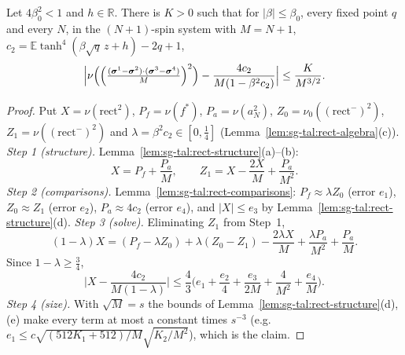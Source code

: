 \begin{theorem}[Proposition~1.8.5, Eq.~(1.238)]
\label{thm:sg-tal:prop-185}
  \leanok
{}
Let $4\beta_0^2<1$ and $h\in\mathbb R$.  There is $K>0$ such that for $|\beta|\le\beta_0$, every fixed point $q$ and every $N$, in the $(N+1)$-spin system with $M=N+1$, $c_2=\mathbb E\tanh^4(\beta\sqrt q\,z+h)-2q+1$,
\[
\Bigl|\nu\Bigl(\Bigl(\tfrac{(\boldsymbol\sigma^1-\boldsymbol\sigma^2)\cdot(\boldsymbol\sigma^3-\boldsymbol\sigma^4)}{M}\Bigr)^2\Bigr)-\frac{4c_2}{M(1-\beta^2c_2)}\Bigr|\le\frac K{M^{3/2}}.
\]
\end{theorem}
\begin{proof}
  \leanok
Put $X=\nu(\mathrm{rect}^2)$, $P_f=\nu(f^*)$, $P_a=\nu(a_N^2)$, $Z_0=\nu_0((\mathrm{rect}^-)^2)$, $Z_1=\nu((\mathrm{rect}^-)^2)$ and $\lambda=\beta^2c_2\in[0,\frac14]$ (Lemma~\ref{lem:sg-tal:rect-algebra}(c)).
\emph{Step 1 (structure).} Lemma~\ref{lem:sg-tal:rect-structure}(a)--(b):
\[
X=P_f+\frac{P_a}M,\qquad Z_1=X-\frac{2X}M+\frac{P_a}{M^2}.
\]
\emph{Step 2 (comparisons).} Lemma~\ref{lem:sg-tal:rect-comparisons}: $P_f\approx\lambda Z_0$ (error $e_1$), $Z_0\approx Z_1$ (error $e_2$), $P_a\approx4c_2$ (error $e_4$), and $|X|\le e_3$ by Lemma~\ref{lem:sg-tal:rect-structure}(d).
\emph{Step 3 (solve).} Eliminating $Z_1$ from Step~1,
\[
(1-\lambda)X=(P_f-\lambda Z_0)+\lambda(Z_0-Z_1)-\frac{2\lambda X}M+\frac{\lambda P_a}{M^2}+\frac{P_a}M .
\]
Since $1-\lambda\ge\frac34$,
\[
\Big|X-\frac{4c_2}{M(1-\lambda)}\Big|\le\frac43\Big(e_1+\frac{e_2}4+\frac{e_3}{2M}+\frac4{M^2}+\frac{e_4}M\Big).
\]
\emph{Step 4 (size).} With $\sqrt M=s$ the bounds of Lemma~\ref{lem:sg-tal:rect-structure}(d),(e) make every term at most a constant times $s^{-3}$ (e.g.\ $e_1\le c\sqrt{(512K_1+512)/M}\sqrt{K_2/M^2}$), which is the claim.
\end{proof}

